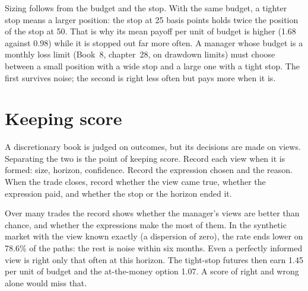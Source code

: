 \begin{omfigure}

\label{fig:s2:discretionary-macro:stops}
\end{omfigure}

Sizing follows from the budget and the stop. With the same budget, a tighter stop means a larger position: the stop at 25 basis points holds twice
the position of the stop at 50. That is why its mean payoff per unit of budget is higher (1.68 against 0.98) while it is stopped out far more often. A
manager whose budget is a monthly loss limit (Book~8, chapter~28, on drawdown limits) must choose between a small position with a wide stop and a
large one with a tight stop. The first survives noise; the second is right less often but pays more when it is.

\section{Keeping score}

A discretionary book is judged on outcomes, but its decisions are made on views. Separating the two is the point of keeping score. Record each view
when it is formed: size, horizon, confidence. Record the expression chosen and the reason. When the trade closes, record whether the view came true,
whether the expression paid, and whether the stop or the horizon ended it.

Over many trades the record shows whether the manager's views are better than chance, and whether the expressions make the most of them. In the
synthetic market with the view known exactly (a dispersion of zero), the rate ends lower on 78.6\% of the paths: the rest is noise within six months.
Even a perfectly informed view is right only that often at this horizon. The tight-stop futures then earn 1.45 per unit of budget and the at-the-money
option 1.07. A score of right and wrong alone would miss that.

